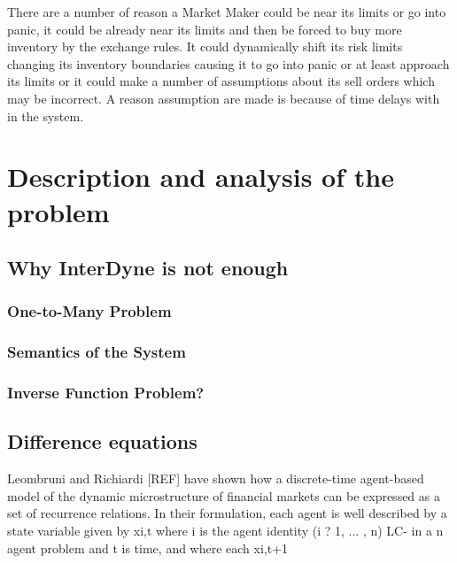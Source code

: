\documentclass{article}
\begin{document}
There are a number of reason a Market Maker could be near its limits or go into panic, it could be already near its limits and then be forced to buy more inventory by the exchange rules. It could dynamically shift its risk limits changing its inventory boundaries causing it to go into panic or at least approach its limits or it could make a number of assumptions about its sell orders which may be incorrect. 
A reason assumption are made is because of time delays with in the system. 






\section {Description and analysis of the problem} 



\subsection{Why InterDyne is not enough}
%


\subsubsection{One-to-Many Problem}
\subsubsection{Semantics of the System} 
\subsubsection{Inverse Function Problem?} 

\subsection{Difference equations} 

Leombruni and Richiardi [REF] have shown how a discrete-time agent-based model of the dynamic microstructure of financial markets can be expressed as a set of recurrence relations.  In their formulation, each agent is well described by a state variable given by xi,t where i is the agent identity (i ? 1, ... , n) LC- in a n agent problem and t is time, and where each xi,t+1  
\end{document}
